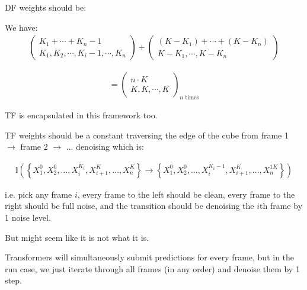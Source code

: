 \documentclass[11pt]{article}
\begin{document}
DF weights should be:

\begin{center}
\end{center}

We have:
\begin{align}
\begin{pmatrix}
K_1 + \cdots + K_n - 1 \\
K_1, K_2, \cdots, K_i - 1, \cdots, K_n
\end{pmatrix} + \begin{pmatrix}
(K - K_1) + \cdots + (K - K_n) \\
K - K_1, \cdots, K - K_n
\end{pmatrix}
\end{align}

\begin{align}
= \begin{pmatrix}
n \cdot K \\
K, K, \cdots, K
\end{pmatrix}_{n \text{ times}}
\end{align}

TF is encapsulated in this framework too.

TF weights should be a constant traversing the edge of the cube from frame 1 $\rightarrow$ frame 2 $\rightarrow$ ... denoising which is:

\begin{align}
\mathbb{I}\left( \left\{ X_1^0, X_2^0, \ldots, X_i^{K_i}, X_{i+1}^K, \ldots, X_n^K \right\} \rightarrow \left\{ X_1^0, X_2^0, \ldots, X_i^{K_i-1}, X_{i+1}^K, \ldots, X_n^{1K} \right\} \right)
\end{align}

i.e. pick any frame $i$, every frame to the left should be clean, every frame to the right should be full noise, and the transition should be denoising the $i$th frame by 1 noise level.

But might seem like it is not what it is.

Transformers will simultaneously submit predictions for every frame, but in the run case, we just iterate through all frames (in any order) and denoise them by 1 step.
\end{document}
